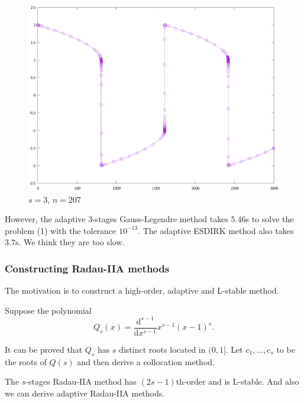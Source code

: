 \documentclass[9pt]{beamer}
\begin{document}
\begin{frame}
\begin{figure}[H]
\begin{minipage}[t]{0.32\linewidth}
      \vspace{-1em}
      \caption{\small $s=2$, $n=269$}
  \end{minipage}
  \begin{minipage}[t]{0.32\linewidth}
      \centering
      \includegraphics[width=0.95\linewidth]{pic/7-6.eps}
      \vspace{-1em}
      \caption{\small $s=3$, $n=207$}
  \end{minipage}
\end{figure}

\pause

However, the adaptive $3$-stages Gauss-Legendre method takes $5.46$s to solve the problem (1) with the tolerance $10^{-13}$. The adaptive ESDIRK method also takes $3.7$s. We think they are too slow.

\end{frame}

\begin{frame}
  \frametitle{Constructing Radau-IIA methods}

  The motivation is to construct a high-order, adaptive and L-stable method.
  \pause

  Suppose the polynomial
  \begin{equation*}
    Q_s(x)=\frac{\text{d}^{s-1}}{\text{d}x^{s-1}} x^{s-1}(x-1)^s.
  \end{equation*}

  It can be proved that $Q_s$ has $s$ distinct roots located in $(0,1]$. Let $c_1,...,c_s$ to be the roots of $Q(s)$ and then derive a collocation method.

  \vspace{1em}
  The $s$-stages Radau-IIA method has $(2s-1)$th-order and is L-stable. And also we can derive adaptive Radau-IIA methods.
\end{frame}
\end{document}
